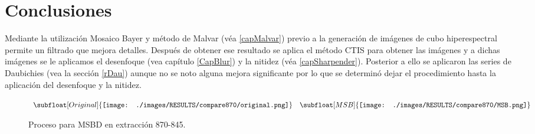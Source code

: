\chapter{Conclusiones} %
\label{Capitulo5} %

Mediante la utilización Mosaico Bayer y método de Malvar (véa \ref{capMalvar}) previo a la generación de imágenes de cubo hiperespectral permite un filtrado que mejora detalles. 
Después de obtener ese resultado se aplica el método CTIS para obtener las imágenes y a dichas imágenes se le aplicamos el desenfoque (vea capítulo \ref{CapBlur}) y la nitidez (véa \ref{capSharpender}).
Posterior a ello se aplicaron las series de Daubichies (vea la sección \ref{rDau}) aunque no se noto alguna mejora significante por lo que se determinó dejar el procedimiento hasta la aplicación del desenfoque y la nitidez.

\begin{figure}[h]
\begin{center}$
\begin{array}{lll}
\subfloat[Original]{\texttt{[image: ./images/RESULTS/compare870/original.png]}}&
\subfloat[MSB]{\texttt{[image: ./images/RESULTS/compare870/MSB.png]}}
\end{array}$
\end{center}

\caption{Proceso para MSBD en extracción 870-845.}
\label{pics:process}
\end{figure}